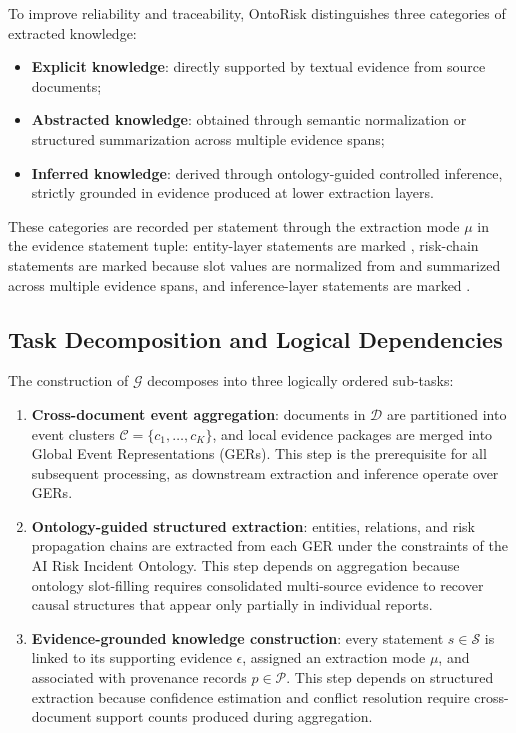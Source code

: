 \documentclass[a4paper,fleqn]{cas-dc}
\begin{document}
To improve reliability and traceability, OntoRisk distinguishes three
categories of extracted knowledge:

\begin{itemize}
  \item \textbf{Explicit knowledge}: directly supported by textual
        evidence from source documents;
  \item \textbf{Abstracted knowledge}: obtained through semantic
        normalization or structured summarization across multiple
        evidence spans;
  \item \textbf{Inferred knowledge}: derived through ontology-guided
        controlled inference, strictly grounded in evidence produced
        at lower extraction layers.
\end{itemize}
These categories are recorded per statement through the extraction
mode $\mu$ in the evidence statement tuple: entity-layer statements
are marked , risk-chain statements are marked
 because slot values are normalized from and
summarized across multiple evidence spans, and inference-layer
statements are marked .

\subsection{Task Decomposition and Logical Dependencies}

The construction of $\mathcal{G}$ decomposes into three logically
ordered sub-tasks:

\begin{enumerate}
\item \textbf{Cross-document event aggregation}: documents in
$\mathcal{D}$ are partitioned into event clusters $\mathcal{C} =
\{c_1, \ldots, c_K\}$, and local evidence packages are merged into
Global Event Representations (GERs).
This step is the prerequisite for all subsequent processing, as
downstream extraction and inference operate over GERs.

\item \textbf{Ontology-guided structured extraction}: entities,
relations, and risk propagation chains are extracted from each GER
under the constraints of the AI Risk Incident Ontology.
This step depends on aggregation because ontology slot-filling
requires consolidated multi-source evidence to recover causal
structures that appear only partially in individual reports.

\item \textbf{Evidence-grounded knowledge construction}: every
statement $s \in \mathcal{S}$ is linked to its supporting evidence
$\epsilon$, assigned an extraction mode $\mu$, and associated with
provenance records $p \in \mathcal{P}$.
This step depends on structured extraction because confidence
estimation and conflict resolution require cross-document support
counts produced during aggregation.

\end{enumerate}
\end{document}
